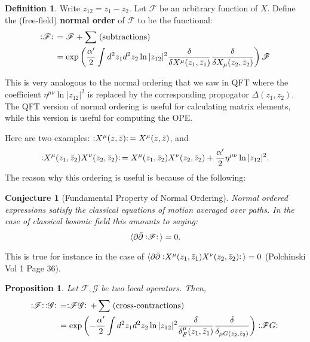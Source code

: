 \documentclass{report}
\theoremstyle{plain}
\newtheorem{proposition}[theorem]{Proposition}
\newtheorem{conjecture}[theorem]{Conjecture}
\theoremstyle{definition}
\newtheorem{definition}[theorem]{Definition}
\theoremstyle{remark}
\newcommand{\FR}[2]{\frac{#1}{#2}}
\newcommand{\ms}{\mathscr}
\newcommand{\di}{\partial}
\newcommand{\NO}[1]{\vcentcolon\mathrel{#1}\vcentcolon\,}
\begin{document}
\begin{definition}
  Write $z_{12} = z_1 - z_2$. Let $\ms F$ be an arbitrary function of
  $X$. Define the (free-field) {\bf normal order} of $\ms F$ to be the
  functional:
  \begin{align}
  \label{normalorderdefinition}
  \NO{\ms F} &= \ms F + \sum \;(\text{subtractions})\\
  &= \exp \left( \FR{\alpha'}{2}\int d^2z_1d^2z_2 \ln|z_{12}|^2
  \FR{\delta}{\delta X^\mu(z_1,\bar z_1)}
  \FR{\delta}{\delta X_\mu(z_2,\bar z_2)} \right) \ms F
  \end{align}
\end{definition}
This is very analogous to the normal ordering that we saw in QFT where the
coefficient $\eta^{\mu\nu}\ln|z_{12}|^2$ is replaced by the corresponding
propogator $\Delta(z_1,z_2)$. The QFT version of normal ordering is useful
for calculating matrix elements, while this version is useful for computing
the OPE.

Here are two examples: $\NO{X^\mu(z,\bar z)} = X^\mu(z,\bar z)$,
and
\begin{align}
\label{normalorder-example}
\NO{X^\mu(z_1,\bar z_2) X^\nu(z_2,\bar z_2)} = X^\mu(z_1,\bar
z_2) X^\nu(z_2,\bar z_2) + \FR{\alpha'}{2}\eta^{\mu\nu}\ln|z_{12}|^2.
\end{align}
The reason why this ordering is useful is because of the following:
\begin{conjecture}[Fundamental Property of Normal Ordering]
\label{fundamentalpropnormalorder}
Normal ordered expressions satisfy the classical
equations of motion averaged over paths. In the case of classical bosonic
field this amounts to saying:
\[ \braket{ \di\bar\di \NO{\ms F} } = 0.\]
\end{conjecture}
This is true for instance in the case of $\braket{\di\bar\di \NO{
X^\mu(z_1,\bar z_1) X^\nu(z_2,\bar z_2)}} = 0$ (Polchinski Vol 1 Page 36).
\begin{proposition} 
\label{prop-product-normal-order}
Let $\ms F,\ms G$ be two local operators. Then,
\begin{align}
 \NO{\ms F}\NO{\ms G} &=
\NO{\ms F\ms G} + \sum \;(\text{cross-contractions})\\
&= \exp\left( -\FR{\alpha'}{2}\int d^2z_1 d^2z_2 \ln|z_{12}|^2
\FR{\delta}{\delta^\mu_F(z_1,\bar z_1)}
\FR{\delta}{\delta_{\mu G(z_2,\bar z_2)}}
\right) \NO{\ms FG}
\end{align}
\end{proposition}
\end{document}
